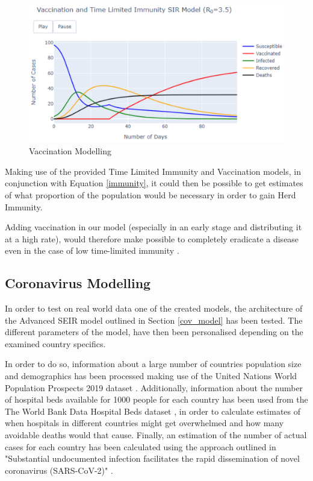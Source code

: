 \begin{figure}[ht!]%
    \centering
    \includegraphics[width=0.85\linewidth]{latex/images/vacc.pdf}
    \vspace{-0.2cm}
    \caption{Vaccination Modelling}
    \label{vacc}
\end{figure}
\vspace{-0.5cm}
Making use of the provided Time Limited Immunity and Vaccination models, in conjunction with Equation \ref{immunity}, it could then be possible to get estimates of what proportion of the population would be necessary in order to gain Herd Immunity. 

Adding vaccination in our model (especially in an early stage and distributing it at a high rate), would therefore make possible to completely eradicate a disease even in the case of low time-limited immunity \cite{next}.

\subsection{Coronavirus Modelling}
In order to test on real world data one of the created models, the architecture of the Advanced SEIR model outlined in Section \ref{cov_model} has been tested. The different parameters of the model, have then been personalised depending on the examined country specifics.

In order to do so, information about a large number of countries population size and demographics has been processed making use of the United Nations World Population Prospects 2019 dataset \cite{pop_data}. Additionally, information about the number of hospital beds available for 1000 people for each country has been used from the The World Bank Data Hospital Beds dataset \cite{beds_data}, in order to calculate estimates of when hospitals in different countries might get overwhelmed and how many avoidable deaths would that cause. Finally, an estimation of the number of actual cases for each country has been calculated using the approach outlined in "Substantial undocumented infection facilitates the rapid dissemination of novel coronavirus (SARS-CoV-2)" \cite{cases_paper}.


